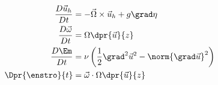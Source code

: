 \begin{subequations}
\begin{align}
	 \frac{D \vec{u}_{h}}{D t}
	&=
	-
	\vec{\Omega} \times \vec{u}_{h}
	+ g \grad \eta
	 \label{eq:NS4} \\
	 \addtocounter{equation}{+1}
	\frac{D \vec{\omega}}{D t}
	&=
	\Omega \dpr{\vec{u}}{z}
	\label{eq:vort4}\\
	 \addtocounter{equation}{+1}
	\frac{D \Em}{D t}
	&=
	\nu\left(
	\frac{1}{2}\grad^2 \vec{u}^2 - \norm{\grad \vec{u}}^2
	\right)
	\label{eq:Emech4}\\
	\Dpr{\enstro}{t}
	&=
	\vec{\omega}\cdot\Omega \dpr{\vec{u}}{z}
	\label{eq:enst4}
\end{align}
\end{subequations}
